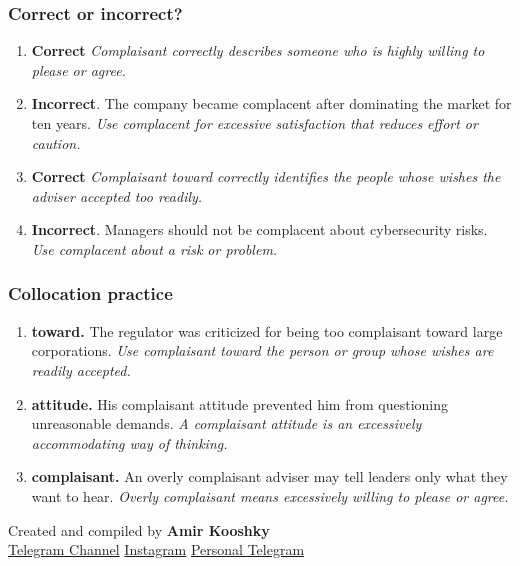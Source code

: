 \documentclass[11pt]{article}
\begin{document}
\subsubsection{Correct or incorrect?}
\begin{enumerate}
  \item \textbf{Correct} \emph{Complaisant correctly describes someone who is highly willing to please or agree.}
  \item \textbf{Incorrect}. The company became complacent after dominating the market for ten years. \emph{Use complacent for excessive satisfaction that reduces effort or caution.}
  \item \textbf{Correct} \emph{Complaisant toward correctly identifies the people whose wishes the adviser accepted too readily.}
  \item \textbf{Incorrect}. Managers should not be complacent about cybersecurity risks. \emph{Use complacent about a risk or problem.}
\end{enumerate}

\subsubsection{Collocation practice}
\begin{enumerate}
  \item \textbf{toward.} The regulator was criticized for being too complaisant toward large corporations. \emph{Use complaisant toward the person or group whose wishes are readily accepted.}
  \item \textbf{attitude.} His complaisant attitude prevented him from questioning unreasonable demands. \emph{A complaisant attitude is an excessively accommodating way of thinking.}
  \item \textbf{complaisant.} An overly complaisant adviser may tell leaders only what they want to hear. \emph{Overly complaisant means excessively willing to please or agree.}
\end{enumerate}

\vfill
\begin{center}
\small\color{Muted} Created and compiled by \textbf{Amir Kooshky}\\
\href{https://t.me/KooshkyTOEFL}{Telegram Channel}\quad\textbullet\quad
\href{https://www.instagram.com/kooshkytoefl}{Instagram}\quad\textbullet\quad
\href{https://t.me/KooshkyTOEFL\_pv}{Personal Telegram}
\end{center}
\end{document}
